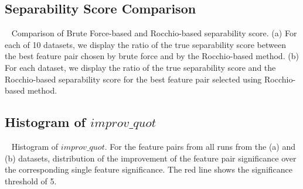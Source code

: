 \subsection{Separability Score Comparison}~\label{appF:exp_sep}
Comparison of Brute Force-based and Rocchio-based separability score. (a) For each of 10 datasets, we display the ratio of the true separability score between the best feature pair chosen by brute force and by the Rocchio-based method. (b) For each dataset, we display the ratio of the true separability score and the Rocchio-based separability score for the best feature pair selected using Rocchio-based method.
\begin{figure}[!htb]
\centering %
\vspace{-5mm}
\label{fig:brute_rocchio}
\end{figure}


\subsection{Histogram of $improv\_quot$}~\label{appF_exp_hist}
Histogram of $improv\_quot$. For the \toptwenty feature pairs from all runs from the (a) \msig and (b) \lincs datasets, distribution of the improvement of the feature pair significance over the corresponding single feature significance. The red line shows the significance threshold of 5.
\begin{figure}[!htb]
\centering %
\vspace{-5mm}
\label{fig:histogram_diff}
\end{figure}
